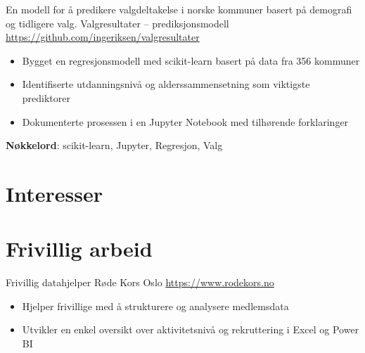 \documentclass[a4paper, serif, 10pt]{moderncv}
\begin{document}
        {En modell for å predikere valgdeltakelse i norske kommuner basert på demografi og tidligere valg.}
        {Valgresultater – prediksjonsmodell}
        {\url{https://github.com/ingeriksen/valgresultater}}
        {}
        {\begin{itemize}
\item Bygget en regresjonsmodell med scikit-learn basert på data fra 356 kommuner
\item Identifiserte utdanningsnivå og alderssammensetning som viktigste prediktorer
\item Dokumenterte prosessen i en Jupyter Notebook med tilhørende forklaringer
\end{itemize}
\textbf{Nøkkelord}: scikit-learn, Jupyter, Regresjon, Valg}
\section{Interesser}

\section{Frivillig arbeid}

        {Frivillig datahjelper}
        {Røde Kors Oslo}
        {\url{https://www.rodekors.no}}
        {}
        {\begin{itemize}
\item Hjelper frivillige med å strukturere og analysere medlemsdata
\item Utvikler en enkel oversikt over aktivitetsnivå og rekruttering i Excel og Power BI
\end{itemize}}
    
\end{document}
